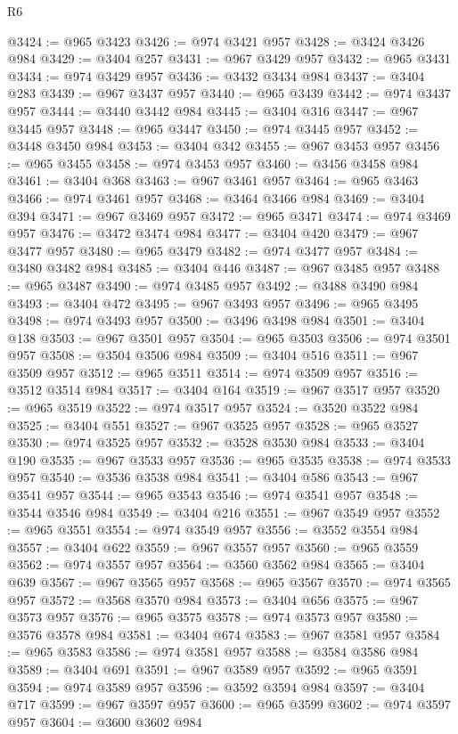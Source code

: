 \begin{lexlean}{R6}
\begin{coremodule}
@3424 := @965 @3423
@3426 := @974 @3421 @957
@3428 := @3424 @3426 @984
@3429 := @3404 @257
@3431 := @967 @3429 @957
@3432 := @965 @3431
@3434 := @974 @3429 @957
@3436 := @3432 @3434 @984
@3437 := @3404 @283
@3439 := @967 @3437 @957
@3440 := @965 @3439
@3442 := @974 @3437 @957
@3444 := @3440 @3442 @984
@3445 := @3404 @316
@3447 := @967 @3445 @957
@3448 := @965 @3447
@3450 := @974 @3445 @957
@3452 := @3448 @3450 @984
@3453 := @3404 @342
@3455 := @967 @3453 @957
@3456 := @965 @3455
@3458 := @974 @3453 @957
@3460 := @3456 @3458 @984
@3461 := @3404 @368
@3463 := @967 @3461 @957
@3464 := @965 @3463
@3466 := @974 @3461 @957
@3468 := @3464 @3466 @984
@3469 := @3404 @394
@3471 := @967 @3469 @957
@3472 := @965 @3471
@3474 := @974 @3469 @957
@3476 := @3472 @3474 @984
@3477 := @3404 @420
@3479 := @967 @3477 @957
@3480 := @965 @3479
@3482 := @974 @3477 @957
@3484 := @3480 @3482 @984
@3485 := @3404 @446
@3487 := @967 @3485 @957
@3488 := @965 @3487
@3490 := @974 @3485 @957
@3492 := @3488 @3490 @984
@3493 := @3404 @472
@3495 := @967 @3493 @957
@3496 := @965 @3495
@3498 := @974 @3493 @957
@3500 := @3496 @3498 @984
@3501 := @3404 @138
@3503 := @967 @3501 @957
@3504 := @965 @3503
@3506 := @974 @3501 @957
@3508 := @3504 @3506 @984
@3509 := @3404 @516
@3511 := @967 @3509 @957
@3512 := @965 @3511
@3514 := @974 @3509 @957
@3516 := @3512 @3514 @984
@3517 := @3404 @164
@3519 := @967 @3517 @957
@3520 := @965 @3519
@3522 := @974 @3517 @957
@3524 := @3520 @3522 @984
@3525 := @3404 @551
@3527 := @967 @3525 @957
@3528 := @965 @3527
@3530 := @974 @3525 @957
@3532 := @3528 @3530 @984
@3533 := @3404 @190
@3535 := @967 @3533 @957
@3536 := @965 @3535
@3538 := @974 @3533 @957
@3540 := @3536 @3538 @984
@3541 := @3404 @586
@3543 := @967 @3541 @957
@3544 := @965 @3543
@3546 := @974 @3541 @957
@3548 := @3544 @3546 @984
@3549 := @3404 @216
@3551 := @967 @3549 @957
@3552 := @965 @3551
@3554 := @974 @3549 @957
@3556 := @3552 @3554 @984
@3557 := @3404 @622
@3559 := @967 @3557 @957
@3560 := @965 @3559
@3562 := @974 @3557 @957
@3564 := @3560 @3562 @984
@3565 := @3404 @639
@3567 := @967 @3565 @957
@3568 := @965 @3567
@3570 := @974 @3565 @957
@3572 := @3568 @3570 @984
@3573 := @3404 @656
@3575 := @967 @3573 @957
@3576 := @965 @3575
@3578 := @974 @3573 @957
@3580 := @3576 @3578 @984
@3581 := @3404 @674
@3583 := @967 @3581 @957
@3584 := @965 @3583
@3586 := @974 @3581 @957
@3588 := @3584 @3586 @984
@3589 := @3404 @691
@3591 := @967 @3589 @957
@3592 := @965 @3591
@3594 := @974 @3589 @957
@3596 := @3592 @3594 @984
@3597 := @3404 @717
@3599 := @967 @3597 @957
@3600 := @965 @3599
@3602 := @974 @3597 @957
@3604 := @3600 @3602 @984

\end{coremodule}
\end{lexlean}
